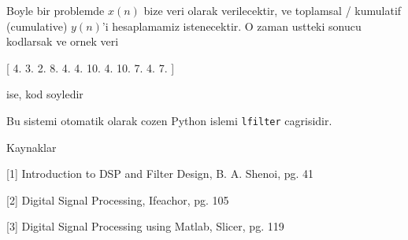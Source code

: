 \documentclass[12pt,fleqn]{article}
\begin{document}
Boyle bir problemde $x(n)$ bize veri olarak verilecektir, ve toplamsal /
kumulatif (cumulative) $y(n)$'i hesaplamamiz istenecektir. O zaman ustteki
sonucu kodlarsak ve ornek veri

[  4.   3.   2.   8.   4.   4.  10.   4.  10.   7.   4.   7. ]

ise, kod soyledir



Bu sistemi otomatik olarak cozen Python islemi \verb!lfilter! cagrisidir. 



Kaynaklar

[1] Introduction to DSP and Filter Design, B. A. Shenoi, pg. 41

[2] Digital Signal Processing, Ifeachor, pg. 105

[3] Digital Signal Processing using Matlab, Slicer, pg. 119
\end{document}
